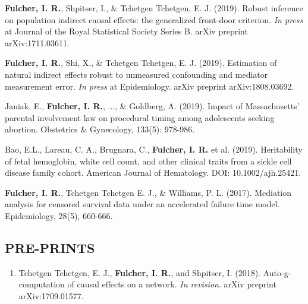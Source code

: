 \documentclass[12pt]{article}
\begin{document}
\begin{etaremune}
	\item \textbf{Fulcher, I. R.}, Shpitser, I., \& Tchetgen Tchetgen, E. J. (2019). Robust inference on population indirect causal effects: the generalized front-door criterion.  \textit{In press} at Journal of the Royal Statistical Society Series B. arXiv preprint arXiv:1711.03611. 
	
	\item \textbf{Fulcher, I. R.}, Shi, X., \& Tchetgen Tchetgen, E. J. (2019). Estimation of natural indirect effects robust to unmeasured confounding and mediator measurement error. \textit{In press} at Epidemiology. arXiv preprint arXiv:1808.03692.  
	
	\item Janiak, E., \textbf{Fulcher, I. R.}, ..., \& Goldberg, A. (2019). Impact of Massachusetts' parental involvement law on procedural timing among adolescents seeking abortion. Obstetrics \& Gynecology, 133(5): 978-986.
	
	\item Bao, E.L., Lareau, C. A., Brugnara, C., \textbf{Fulcher, I. R.} et al. (2019). Heritability of fetal hemoglobin, white cell count, and other clinical traits from a sickle cell disease family cohort. American Journal of Hematology. DOI: 10.1002/ajh.25421. 
	
	\item \textbf{Fulcher, I. R.}, Tchetgen Tchetgen E. J., \& Williams, P. L. (2017). Mediation analysis for censored survival data under an accelerated failure time model.  Epidemiology, 28(5), 660-666. 
\end{etaremune}

\subsection*{\textbf{PRE-PRINTS}}

\begin{enumerate}
	\item Tchetgen Tchetgen, E. J., \textbf{Fulcher, I. R.}, and Shpitser, I. (2018). Auto-g-computation of causal effects on a network. \textit{In revision}. arXiv preprint arXiv:1709.01577. 
\end{enumerate}

\end{document}
